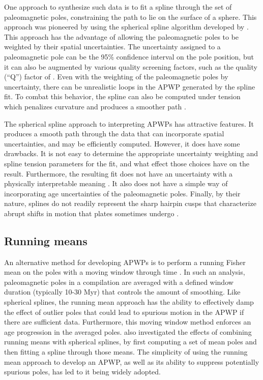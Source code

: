 \documentclass[11pt,letterpaper]{article}
\begin{document}
One approach to synthesize such data is to fit a spline through the set of paleomagnetic poles, constraining the path to lie on the surface of a sphere. This approach was pioneered by \cite{Torsvik1992a} using the spherical spline algorithm developed by \cite{Jupp1987a}. This approach has the advantage of allowing the paleomagnetic poles to be weighted by their spatial uncertainties. The uncertainty assigned to a paleomagnetic pole can be the 95\% confidence interval on the pole position, but it can also be augmented by various quality screening factors, such as the quality (``Q'') factor of \cite{Van-der-Voo1990a} \citep{Torsvik1992a}. Even with the weighting of the paleomagnetic poles by uncertainty, there can be unrealistic loops in the APWP generated by the spline fit. To combat this behavior, the spline can also be computed under tension which penalizes curvature and produces a smoother path \citep{Torsvik1996a}.

The spherical spline approach to interpreting APWPs has attractive features. It produces a smooth path through the data that can incorporate spatial uncertainties, and may be efficiently computed. However, it does have some drawbacks. It is not easy to determine the appropriate uncertainty weighting and spline tension parameters for the fit, and what effect those choices have on the result. Furthermore, the resulting fit does not have an uncertainty with a physically interpretable meaning \citep{Torsvik1996a}. It also does not have a simple way of incorporating age uncertainties of the paleomagnetic poles. Finally, by their nature, splines do not readily represent the sharp hairpin cusps that characterize abrupt shifts in motion that plates sometimes undergo \citep{Irving1972a, Gordon1984a, Torsvik2012a}.

\subsection*{Running means}

An alternative method for developing APWPs is to perform a running Fisher mean on the poles with a moving window through time \citep{Irving1977a, Van-der-Voo2001a, Torsvik2008a}. In such an analysis, paleomagnetic poles in a compilation are averaged with a defined window duration (typically 10-30 Myr) that controls the amount of smoothing. Like spherical splines, the running mean approach has the ability to effectively damp the effect of outlier poles that could lead to spurious motion in the APWP if there are sufficient data. Furthermore, this moving window method enforces an age progression in the averaged poles. \cite{Torsvik2008a} also investigated the effects of combining running means with spherical splines, by first computing a set of mean poles and then fitting a spline through those means. The simplicity of using the running mean approach to develop an APWP, as well as its ability to suppress potentially spurious poles, has led to it being widely adopted.
\end{document}
